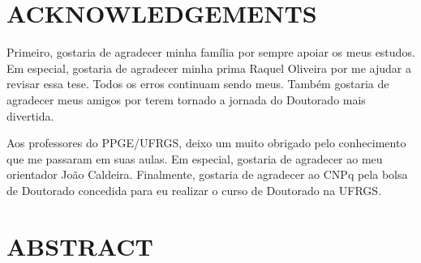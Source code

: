 \documentclass[12pt,oneside,a4paper]{memoir}
\begin{document}
\clearpage

\chapter*{ACKNOWLEDGEMENTS} 

Primeiro, gostaria de agradecer minha família por sempre apoiar os meus estudos.
Em especial, gostaria de agradecer minha prima Raquel Oliveira por me ajudar a revisar essa tese.
Todos os erros continuam sendo meus.
Também gostaria de agradecer meus amigos por terem tornado a jornada do Doutorado mais divertida.

Aos professores do PPGE/UFRGS, deixo um muito obrigado pelo conhecimento que me passaram em suas aulas.
Em especial, gostaria de agradecer ao meu orientador João Caldeira.
Finalmente, gostaria de agradecer ao CNPq pela bolsa de Doutorado concedida para eu realizar o curso de Doutorado na UFRGS.

\clearpage

\chapter*{ABSTRACT} 
\end{document}
